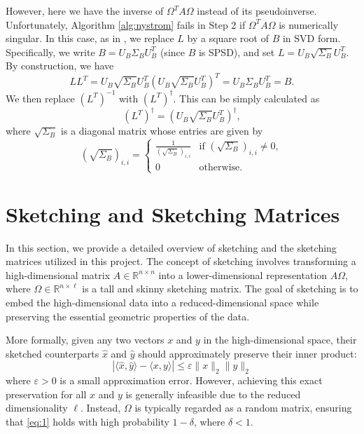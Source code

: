 \documentclass[a4paper, 12pt,oneside]{article}
\begin{document}
However, here we have the inverse of $\Omega^T A \Omega$ instead of its pseudoinverse. Unfortunately, Algorithm \ref{alg:nystrom} fails in Step 2 if $\Omega^T A \Omega$ is numerically singular. In this case, as in \cite{reference}, we replace $L$ by a square root of $B$ in SVD form. Specifically, we write $B = U_B \Sigma_B U_B^T$ (since $B$ is SPSD), and set $L = U_B \sqrt{\Sigma_B} U_B^T$. By construction, we have
\[
LL^T = U_B \sqrt{\Sigma_B} U_B^T (U_B \sqrt{\Sigma_B} U_B^T)^T = U_B \Sigma_B U_B^T = B.
\]
We then replace $(L^T)^{-1}$ with $(L^T)^\dagger$. This can be simply calculated as
\[
(L^T)^\dagger = (U_B \sqrt{\Sigma_B} U_B^T)^\dagger,
\]
where $\sqrt{\Sigma_B}$ is a diagonal matrix whose entries are given by
\[
(\sqrt{\Sigma_B})_{i,i} = \begin{cases} \frac{1}{(\sqrt{\Sigma_B})_{i,i}} & \text{if } (\sqrt{\Sigma_B})_{i,i} \neq 0, \\
0 & \text{otherwise.} \end{cases}
\]
\section{Sketching and Sketching Matrices}

In this section, we provide a detailed overview of sketching and the sketching matrices utilized in this project. The concept of sketching involves transforming a high-dimensional matrix $A \in \mathbb{R}^{n \times n}$ into a lower-dimensional representation $A\Omega$, where $\Omega \in \mathbb{R}^{n \times \ell}$ is a tall and skinny sketching matrix. The goal of sketching is to embed the high-dimensional data into a reduced-dimensional space while preserving the essential geometric properties of the data.

More formally, given any two vectors $x$ and $y$ in the high-dimensional space, their sketched counterparts $\hat{x}$ and $\hat{y}$ should approximately preserve their inner product:
\begin{equation}\label{eq:1}
\left| \langle \hat{x}, \hat{y} \rangle - \langle x, y \rangle \right| \leq \varepsilon \|x\|_2 \|y\|_2 \tag{2}
\end{equation}
where $\varepsilon > 0$ is a small approximation error. However, achieving this exact preservation for all $x$ and $y$ is generally infeasible due to the reduced dimensionality $\ell$. Instead, $\Omega$ is typically regarded as a random matrix, ensuring that \cref{eq:1} holds with high probability $1 - \delta$, where $\delta < 1$.
\end{document}

